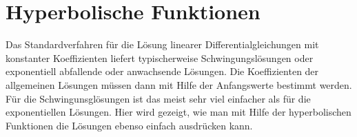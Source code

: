 %
%
%
\chapter{Hyperbolische Funktionen}
Das Standardverfahren für die Lösung linearer Differentialgleichungen
mit konstanter Koeffizienten liefert typischerweise Schwingungslösungen
oder exponentiell abfallende oder anwachsende Lösungen. Die Koeffizienten
der allgemeinen Lösungen müssen dann mit Hilfe der Anfangswerte bestimmt
werden. Für die Schwingunsglösungen ist das meist sehr viel einfacher
als für die exponentiellen Lösungen. Hier wird gezeigt, wie man mit
Hilfe der hyperbolischen Funktionen die Lösungen ebenso einfach ausdrücken
kann.



